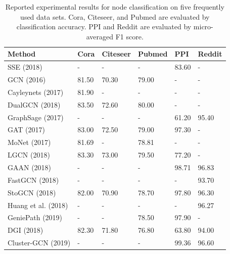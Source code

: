		\begin{table}[h]
	\caption{Reported experimental results for node classification on five frequently used data sets.  Cora, Citeseer, and Pubmed are evaluated by classification accuracy.
		PPI and Reddit are evaluated by micro-averaged F1 score. 
	}
	\label{tab:bennode}
	\centering
	\scriptsize
	\begin{tabular}{l l l l l l}
		\toprule
		Method       & Cora     & Citeseer & Pubmed   & PPI   & Reddit    \\ \midrule
		SSE (2018)          & -        & -        & -        & 83.60    & - \\ \hline
		GCN (2016)   & 81.50     & 70.30     & 79.00     & -     &  -  \\ \hline
		Cayleynets (2017)   & 81.90 & -        & -        & -   &    - \\ \hline
		DualGCN (2018)      & 83.50     & 72.60     & 80.00     & -    &  -   \\ \hline
		GraphSage (2017)     & -        & -        & -        & 61.20     &  95.40 \\ \hline
		GAT (2017)          & 83.00 & 72.50 & 79.00 &  97.30 & -  \\ \hline
		MoNet (2017)  & 81.69   & -    &  78.81    & -     &   -  \\ \hline
		LGCN (2018)         & 83.30 & 73.00 & 79.50 & 77.20  &  -  \\ \hline
		GAAN (2018)         & -        & -        & -        & 98.71 & 96.83 \\ \hline
		FastGCN (2018)  & - & - & - & - & 93.70 \\ \hline
		StoGCN (2018)     & 82.00 & 70.90  & 78.70   & 97.80   &  96.30 \\ \hline
		Huang et al. (2018) & - & - & -& - & 96.27 \\ \hline
		GeniePath (2019)   & -        & -        & 78.50     & 97.90      & - \\ \hline
		DGI (2018) & 82.30 & 71.80 & 76.80 & 63.80 & 94.00 \\ \hline
		Cluster-GCN (2019) & - & - &- & 99.36 & 96.60 \\ \bottomrule
	\end{tabular}
\end{table}



